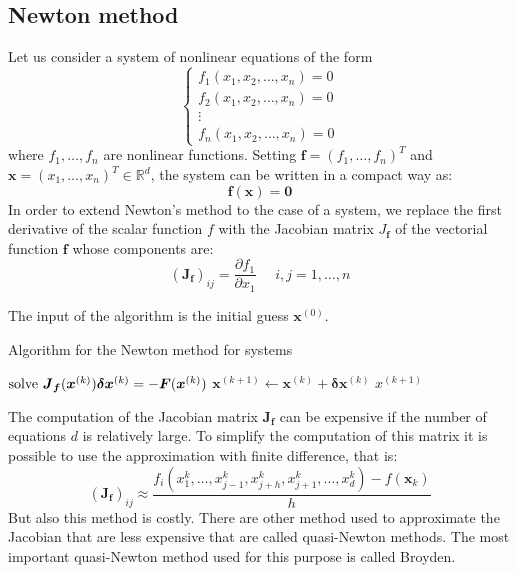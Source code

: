\documentclass[12pt, a4paper]{report}
\newtheorem[style=M,bodystyle=\normalfont]{theorem}{Theorem}
\newtheorem[style=M,bodystyle=\normalfont]{proposition}{Proposition}
\newtheorem[style=M,bodystyle=\normalfont]{corollary}{Corollary}
\newtheorem[style=M,bodystyle=\normalfont]{lemma}{Lemma}
\newtheorem[style=M,bodystyle=\normalfont]{definition}{Definition}
\begin{document}
    \subsection{Newton method}
    Let us consider a system of nonlinear equations of the form
    \[\begin{cases}
        f_1(x_1,x_2,\dots,x_n)=0 \\
        f_2(x_1,x_2,\dots,x_n)=0 \\
        \vdots                   \\
        f_n(x_1,x_2,\dots,x_n)=0 
    \end{cases}\]
    where $f_1,\dots,f_n$ are nonlinear functions. Setting $\boldsymbol{f}=(f_1,\dots,f_n)^T$ and $\boldsymbol{x}=(x_1,\dots,x_n)^T \in \mathbb{R}^d$, the system can be written in a compact way as: 
    \[\boldsymbol{f}(\boldsymbol{x})=\boldsymbol{0}\]
    In order to extend Newton's method to the case of a system, we replace the first derivative of the scalar function $f$ with the Jacobian matrix $J_{\boldsymbol{f}}$ of the vectorial 
    function $\boldsymbol{f}$ whose components are: 
    \[(\boldsymbol{J}_{\boldsymbol{f}})_{ij}=\dfrac{\partial f_1}{\partial x_1} \:\:\:\:\:\: i,j=1,\dots,n\]

    The input of the algorithm is the initial guess $\boldsymbol{x}^{(0)}$. 
    \begin{algorithm}[H]
        \caption{Algorithm for the Newton method for systems}
            \begin{algorithmic}[1]
                    \State $\textnormal{solve  } \boldsymbol{J}_{\boldsymbol{f}}(\boldsymbol{x}^{(k)})\boldsymbol{\delta}\boldsymbol{x}^{(k)}=-\boldsymbol{F}(\boldsymbol{x}^{(k)})$
                    \State $\boldsymbol{x}^{(k+1)} \leftarrow \boldsymbol{x}^{(k)}+\boldsymbol{\delta}\boldsymbol{x}^{(k)}$
                        \State \Return $x^{(k+1)}$
                    \EndIf
                \EndFor
            \end{algorithmic}
    \end{algorithm}
    The computation of the Jacobian matrix $\boldsymbol{J}_{\boldsymbol{f}}$ can be expensive if the number of equations $d$ is relatively large. To simplify the computation of this matrix
    it is possible to use the approximation with finite difference, that is: 
    \[(\boldsymbol{J}_{\boldsymbol{f}})_{ij} \approx \dfrac{f_i(x_1^{k},\dots,x_{j-1}^{k},x_{j+h}^{k},x_{j+1}^{k},\dots,x_{d}^{k})-f(\boldsymbol{x}_{k})}{h}\]
    But also this method is costly. There are other method used to approximate the Jacobian that are less expensive that are called quasi-Newton methods. The most important 
    quasi-Newton method used for this purpose is called Broyden. 
\end{document}

